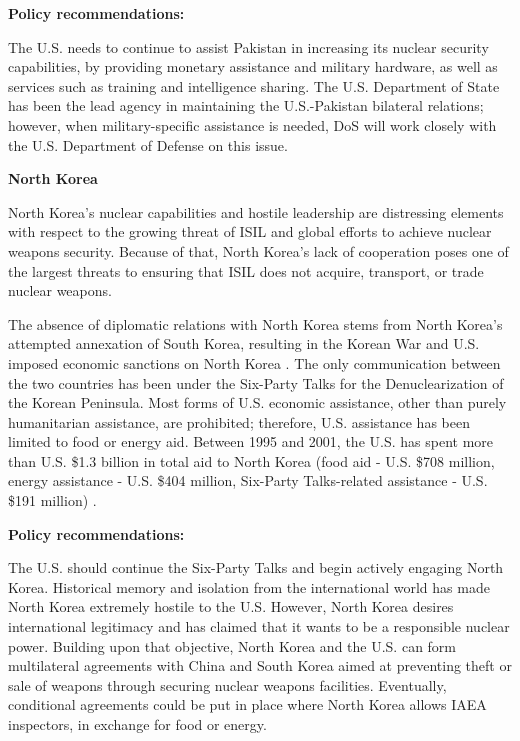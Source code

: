 \documentclass{report}
\begin{document}
\textbf{Policy recommendations:}

The U.S. needs to continue to assist Pakistan in increasing its nuclear security capabilities, by providing monetary assistance and military hardware, as well as services such as training and intelligence sharing. The U.S. Department of State has been the lead agency in maintaining the U.S.-Pakistan bilateral relations; however, when military-specific assistance is needed, DoS will work closely with the U.S. Department of Defense on this issue.


\textbf{North Korea}

North Korea's nuclear capabilities and hostile leadership are distressing elements with respect to the growing threat of ISIL and global efforts to achieve nuclear weapons security. Because of that, North Korea's lack of cooperation poses one of the largest threats to ensuring that ISIL does not acquire, transport, or trade nuclear weapons.

The absence of diplomatic relations with North Korea stems from North Korea's attempted annexation of South Korea, resulting in the Korean War and U.S. imposed economic sanctions on North Korea \cite{U.S.DepartmentofState2015a}. The only communication between the two countries has been under the Six-Party Talks for the Denuclearization of the Korean Peninsula. Most forms of U.S. economic assistance, other than purely humanitarian assistance, are prohibited; therefore, U.S. assistance has been limited to food or energy aid. Between 1995 and 2001, the U.S. has spent more than U.S. \$1.3 billion  in total aid to North Korea (food aid - U.S. \$708 million, energy assistance - U.S. \$404 million, Six-Party Talks-related assistance - U.S. \$191 million) \cite{Manyin2014}.

\textbf{Policy recommendations:}


The U.S. should continue the Six-Party Talks and begin actively engaging North Korea. Historical memory and isolation from the international world has made North Korea extremely hostile to the U.S. However, North Korea desires international legitimacy and has claimed that it wants to be a responsible nuclear power. Building upon that objective, North Korea and the U.S. can form multilateral agreements with China and South Korea aimed at preventing theft or sale of weapons through securing nuclear weapons facilities. Eventually, conditional agreements could be put in place where North Korea allows IAEA inspectors, in exchange for food or energy. 
\end{document}

